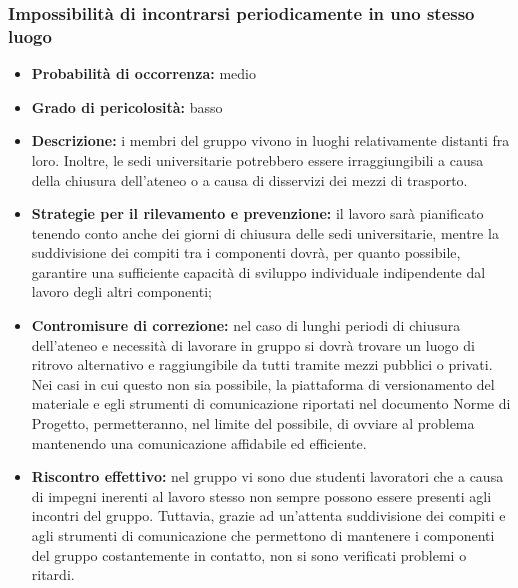 \subsubsection{Impossibilità di incontrarsi periodicamente in uno stesso luogo}
\hypertarget{subsubsect:incontri}{}
\begin{itemize}
\item \textbf{Probabilità di occorrenza:} medio
\item \textbf{Grado di pericolosità:} basso
\item \textbf{Descrizione:} i membri del gruppo vivono in luoghi relativamente distanti fra loro. Inoltre, le sedi universitarie potrebbero essere irraggiungibili a causa della chiusura dell'ateneo o a causa di disservizi dei mezzi di trasporto.

\item \textbf{Strategie per il rilevamento e prevenzione:}  il lavoro sarà pianificato tenendo conto anche dei giorni di chiusura delle sedi universitarie, mentre la suddivisione dei compiti tra i componenti dovrà, per quanto possibile, garantire una sufficiente capacità di sviluppo individuale indipendente dal lavoro degli altri componenti;

\item \textbf{Contromisure di correzione:} nel caso di lunghi periodi di chiusura dell'ateneo e necessità di lavorare in gruppo si dovrà trovare un luogo di ritrovo alternativo e raggiungibile da tutti tramite mezzi pubblici o privati. Nei casi in cui questo non sia possibile, la piattaforma di versionamento del materiale e egli strumenti di comunicazione riportati nel documento Norme di Progetto, permetteranno, nel limite del possibile, di ovviare al problema mantenendo una comunicazione affidabile ed efficiente.

\item \textbf{Riscontro effettivo:} nel gruppo vi sono due studenti lavoratori che a causa di impegni inerenti al lavoro stesso non sempre possono essere presenti agli incontri del gruppo. Tuttavia, grazie ad un'attenta suddivisione dei compiti e agli strumenti di comunicazione che permettono di mantenere i componenti del gruppo costantemente in contatto, non si sono verificati problemi o ritardi.
\end{itemize}

